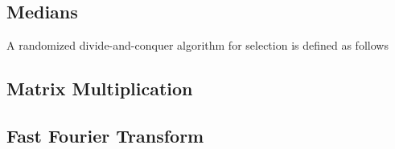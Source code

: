 \subsection{Medians}

\begin{definition}[selection]
A randomized divide-and-conquer algorithm for selection is defined as follows

\end{definition}

\subsection{Matrix Multiplication}

\begin{definition}

\end{definition}

\subsection{Fast Fourier Transform}
